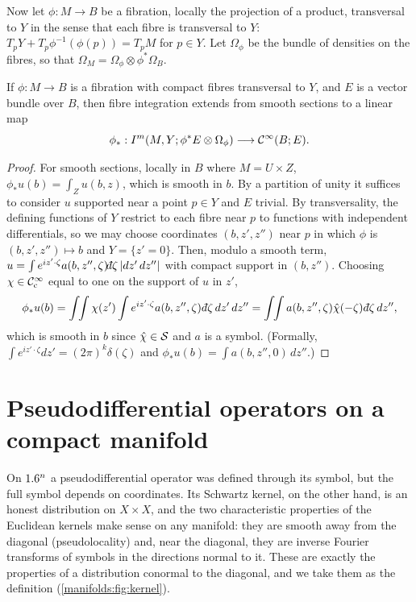 Now let $\phi:M\to B$ be a fibration, locally the projection of a product,
transversal to $Y$ in the sense that each fibre is transversal to $Y$:
$T_pY+T_p\phi^{-1}(\phi(p))=T_pM$ for $p\in Y$. Let $\Omega_\phi$ be the bundle
of densities on the fibres, so that $\Omega_M=\Omega_\phi\otimes\phi^*\Omega_B$.

\begin{proposition}\label{manifolds:prop:pushforward}
If $\phi:M\to B$ is a fibration with compact fibres transversal to $Y$, and $E$
is a vector bundle over $B$, then fibre integration extends from smooth sections
to a linear map
\begin{equation*}
\phi_*:I^{m}(M,Y;\phi^*E\otimes\Omega_\phi)\longrightarrow\mathcal{C}^\infty(B;E).
\end{equation*}
\end{proposition}
\begin{proof}
For smooth sections, locally in $B$ where $M=U\times Z$, $\phi_*u(b)=\int_Zu(b,z)$,
which is smooth in $b$. By a partition of unity it suffices to consider $u$
supported near a point $p\in Y$ and $E$ trivial. By transversality, the defining
functions of $Y$ restrict to each fibre near $p$ to functions with independent
differentials, so we may choose coordinates $(b,z',z'')$ near $p$ in which $\phi$
is $(b,z',z'')\mapsto b$ and $Y=\{z'=0\}$. Then, modulo a smooth term,
$u=\int e^{iz'\cdot\zeta}a(b,z'',\zeta)\dbar\zeta\,|dz'\,dz''|$ with compact support in
$(b,z'')$. Choosing $\chi\in\mathcal{C}^\infty_{\mathrm{c}}$ equal to one on the support of $u$ in $z'$,
\begin{equation*}
\phi_*u(b)=\int\!\!\int\chi(z')\int e^{iz'\cdot\zeta}a(b,z'',\zeta)\,\dbar\zeta\,dz'\,dz''
=\int\!\!\int a(b,z'',\zeta)\hat\chi(-\zeta)\,\dbar\zeta\,dz'',
\end{equation*}
which is smooth in $b$ since $\hat\chi\in\mathcal{S}$ and $a$ is a symbol. (Formally,
$\int e^{iz'\cdot\zeta}dz'=(2\pi)^k\delta(\zeta)$ and $\phi_*u(b)=\int a(b,z'',0)\,dz''$.)
\end{proof}

\section{Pseudodifferential operators on a compact manifold}\label{manifolds:sec:definition}

On $1.6^n$ a pseudodifferential operator was defined through its symbol, but
the full symbol depends on coordinates. Its Schwartz kernel, on the other
hand, is an honest distribution on $X\times X$, and the two characteristic
properties of the Euclidean kernels make sense on any manifold: they are
smooth away from the diagonal (pseudolocality) and, near the diagonal, they
are inverse Fourier transforms of symbols in the directions normal to it.
These are exactly the properties of a distribution conormal to the diagonal,
and we take them as the definition (\cref{manifolds:fig:kernel}).

